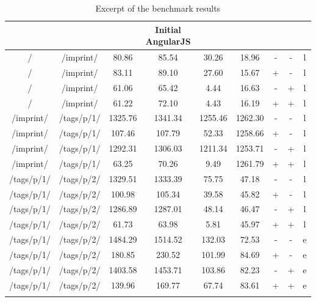 \begin{center}
\footnotesize
\begin{longtable}{ccccccccc}
    \caption{Excerpt of the \selenium{} benchmark results}
    \\
	\hline
	\thead{From} & \thead{To} & \thead{Common} & \thead{Initial\\AngularJS} & \thead{\lare{}} & \thead{AngularJS} &  \thead{DC} & \thead{TC} & \thead{} \\
	\hline
/ & /imprint/ & 80.86 & 85.54 & 30.26 & 18.96 & - & - & l \\
/ & /imprint/ & 83.11 & 89.10 & 27.60 & 15.67 & + & - & l \\
/ & /imprint/ & 61.06 & 65.42 & 4.44 & 16.63 & - & + & l \\
/ & /imprint/ & 61.22 & 72.10 & 4.43 & 16.19 & + & + & l \\
	\hline
	\hline
/imprint/ & /tags/p/1/ & 1325.76 & 1341.34 & 1255.46 & 1262.30 & - & - & l \\
/imprint/ & /tags/p/1/ & 107.46 & 107.79 & 52.33 & 1258.66 & + & - & l \\
/imprint/ & /tags/p/1/ & 1292.31 & 1306.03 & 1211.34 & 1253.71 & - & + & l \\
/imprint/ & /tags/p/1/ & 63.25 & 70.26 & 9.49 & 1261.79 & + & + & l \\
\hline
\hline
/tags/p/1/ & /tags/p/2/ & 1329.51 & 1333.39 & 75.75 & 47.18 & - & - & l \\
/tags/p/1/ & /tags/p/2/ & 100.98 & 105.34 & 39.58 & 45.82 & + & - & l \\
/tags/p/1/ & /tags/p/2/ & 1286.89 & 1287.01 & 48.14 & 46.47 & - & + & l \\
/tags/p/1/ & /tags/p/2/ & 61.73 & 63.98 & 5.81 & 45.97 & + & + & l \\
\hline
\hline
/tags/p/1/ & /tags/p/2/ & 1484.29 & 1514.52 & 132.03 & 72.53 & - & - & e \\
/tags/p/1/ & /tags/p/2/ & 180.85 & 230.52 & 101.99 & 84.69 & + & - & e \\
/tags/p/1/ & /tags/p/2/ & 1403.58 & 1453.71 & 103.86 & 82.23 & - & + & e \\
/tags/p/1/ & /tags/p/2/ & 139.96 & 169.77 & 67.74 & 83.61 & + & + & e \\
\hline
\label{tab:short_selenium}
\end{longtable}
\end{center}

